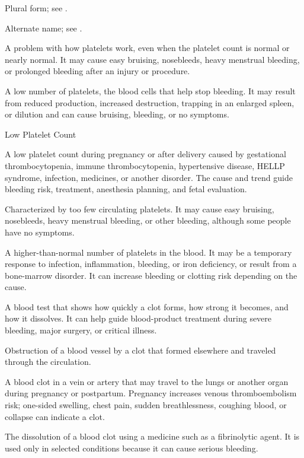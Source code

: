  Plural form; see .

 Alternate name; see .

 A problem with how platelets work, even when the platelet count is normal or nearly normal. It may cause easy bruising, nosebleeds, heavy menstrual bleeding, or prolonged bleeding after an injury or procedure.

 A low number of platelets, the blood cells that help stop bleeding. It may result from reduced production, increased destruction, trapping in an enlarged spleen, or dilution and can cause bruising, bleeding, or no symptoms.

\synonyms
Low Platelet Count

 A low platelet count during pregnancy or after delivery caused by gestational thrombocytopenia, immune thrombocytopenia, hypertensive disease, HELLP syndrome, infection, medicines, or another disorder. The cause and trend guide bleeding risk, treatment, anesthesia planning, and fetal evaluation.

 Characterized by too few circulating platelets. It may cause easy bruising, nosebleeds, heavy menstrual bleeding, or other bleeding, although some people have no symptoms.

 A higher-than-normal number of platelets in the blood. It may be a temporary response to infection, inflammation, bleeding, or iron deficiency, or result from a bone-marrow disorder. It can increase bleeding or clotting risk depending on the cause.

 A blood test that shows how quickly a clot forms, how strong it becomes, and how it dissolves. It can help guide blood-product treatment during severe bleeding, major surgery, or critical illness.

 Obstruction of a blood vessel by a clot that formed elsewhere and traveled through the circulation.

 A blood clot in a vein or artery that may travel to the lungs or another organ during pregnancy or postpartum. Pregnancy increases venous thromboembolism risk; one-sided swelling, chest pain, sudden breathlessness, coughing blood, or collapse can indicate a clot.

 The dissolution of a blood clot using a medicine such as a fibrinolytic agent. It is used only in selected conditions because it can cause serious bleeding.

